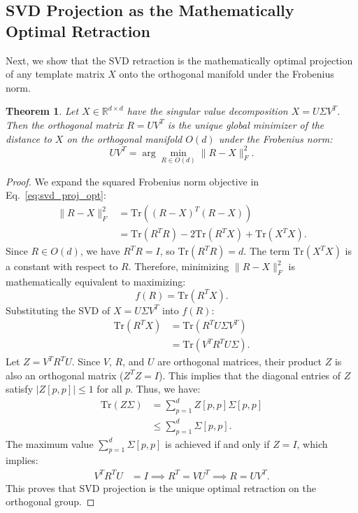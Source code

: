 \documentclass{article}
\theoremstyle{plain}
\newtheorem{theorem}{Theorem}[section]
\theoremstyle{definition}
\theoremstyle{remark}
\begin{document}
\subsection{SVD Projection as the Mathematically Optimal Retraction}
Next, we show that the SVD retraction is the mathematically optimal projection of any template matrix $X$ onto the orthogonal manifold under the Frobenius norm.

\begin{theorem}
Let $X \in \mathbb{R}^{d \times d}$ have the singular value decomposition $X = U \Sigma V^T$. Then the orthogonal matrix $R = U V^T$ is the unique global minimizer of the distance to $X$ on the orthogonal manifold $O(d)$ under the Frobenius norm:
\begin{equation}
\label{eq:svd_proj_opt}
U V^T = \arg \min_{R \in O(d)} \|R - X\|_F^2.
\end{equation}
\end{theorem}

\begin{proof}
We expand the squared Frobenius norm objective in Eq.~\eqref{eq:svd_proj_opt}:
\begin{align}
\|R - X\|_F^2 &= \text{Tr}\left( (R - X)^T (R - X) \right) \nonumber \\
&= \text{Tr}(R^T R) - 2 \text{Tr}(R^T X) + \text{Tr}(X^T X).
\end{align}
Since $R \in O(d)$, we have $R^T R = I$, so $\text{Tr}(R^T R) = d$. The term $\text{Tr}(X^T X)$ is a constant with respect to $R$. Therefore, minimizing $\|R - X\|_F^2$ is mathematically equivalent to maximizing:
\begin{equation}
f(R) = \text{Tr}(R^T X).
\end{equation}
Substituting the SVD of $X = U \Sigma V^T$ into $f(R)$:
\begin{align}
\text{Tr}(R^T X) &= \text{Tr}(R^T U \Sigma V^T) \nonumber \\
&= \text{Tr}(V^T R^T U \Sigma).
\end{align}
Let $Z = V^T R^T U$. Since $V$, $R$, and $U$ are orthogonal matrices, their product $Z$ is also an orthogonal matrix ($Z^T Z = I$). This implies that the diagonal entries of $Z$ satisfy $|Z[p,p]| \le 1$ for all $p$. Thus, we have:
\begin{align}
\text{Tr}(Z \Sigma) &= \sum_{p=1}^d Z[p,p] \Sigma[p,p] \nonumber \\
&\le \sum_{p=1}^d \Sigma[p,p].
\end{align}
The maximum value $\sum_{p=1}^d \Sigma[p,p]$ is achieved if and only if $Z = I$, which implies:
\begin{align}
V^T R^T U &= I \implies R^T = V U^T \implies R = U V^T.
\end{align}
This proves that SVD projection is the unique optimal retraction on the orthogonal group.
\end{proof}
\end{document}
